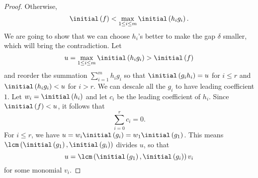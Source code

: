 \documentclass[co439]{subfiles}
\begin{document}
\begin{proof}
        Otherwise,
        \begin{equation*}
            \initial\left( f \right) < \max_{1\leq i\leq m} \initial\left( h_ig_i \right).
        \end{equation*}
        We are going to show that we can choose $h_i$'s better to make the gap $\delta$ smaller, which will bring the contradiction. Let
        \begin{equation*}
             u = \max_{1\leq i\leq m}\initial\left( h_ig_i \right) > \initial\left( f \right)
        \end{equation*}
        and reorder the summation $\sum^{m}_{i=1}h_ig_i$ so that $\initial\left( g_ih_i \right) = u$ for $i\leq r$ and $\initial\left( h_ig_i \right)<u$ for $i>r$. We can descale all the $g_i$ to have leading coefficient $1$. Let $w_i = \initial\left( h_i \right)$ and let $c_i$ be the leading coefficient of $h_i$. Since $\initial\left( f \right) < u$, it follows that
        \begin{equation*}
            \sum^{r}_{i=0} c_i = 0.
        \end{equation*}
        For $i\leq r$, we have $u = w_i\initial\left( g_i \right) = w_1\initial\left( g_1 \right)$. This means $\lcm\left(\initial\left( g_1 \right),\initial\left( g_i \right) \right)$ divides $u$, so that
        \begin{equation*}
             u = \lcm\left( \initial\left( g_1 \right),\initial\left( g_i \right) \right)v_i
        \end{equation*}
        for some monomial $v_i$.


\end{proof}
\end{document}
